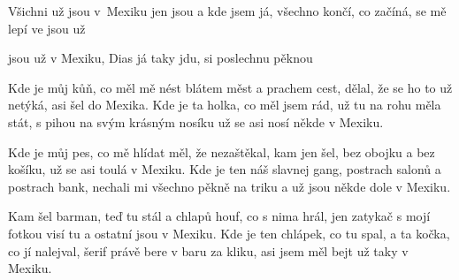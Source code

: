 \begin{TEXT}{Všichni už jsou v~Mexiku}
\SLOKA {} jen jsou a kde jsem já,  všechno končí, co začíná,\NL
    se mě lepí ve    jsou už 

\REFREN {} jsou už v Mexiku,  Dias já taky jdu,\NL
    si poslechnu pěknou   

\SLOKA Kde je můj kůň, co měl mě nést blátem měst a prachem cest,\NL
   dělal, že se ho to už netýká, asi šel do Mexika.\NL
   Kde je ta holka, co měl jsem rád, už tu na rohu měla stát,\NL
   s pihou na svým krásným nosíku už se asi nosí někde v Mexiku.

\REFRENHRAJ
\SLOKA Kde je můj pes, co mě hlídat měl, že nezaštěkal, kam jen šel,\NL
   bez obojku a bez košíku, už se asi toulá v Mexiku.\NL
   Kde je ten náš slavnej gang, postrach salonů a postrach bank,\NL
   nechali mi všechno pěkně na triku a už jsou někde dole v Mexiku.

 \REFRENHRAJ


\SLOKA Kam šel barman, teď tu stál a chlapů houf, co s nima hrál,\NL
   jen zatykač s mojí fotkou visí tu a ostatní jsou v Mexiku.\NL
   Kde je ten chlápek, co tu spal, a ta kočka, co jí nalejval,\NL
   šerif právě bere v baru za kliku, asi jsem měl bejt už taky v Mexiku.

\REFRENHRAJ


\end{TEXT}
